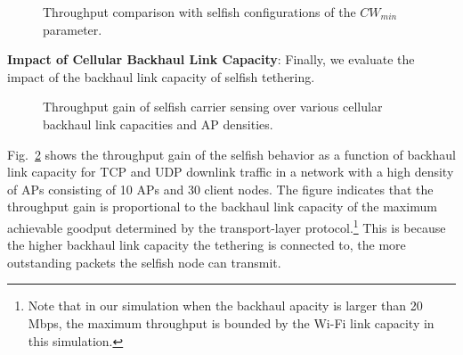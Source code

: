 \begin{figure} [ht]
{      }
    \caption{Throughput comparison with selfish configurations of the $CW_{min}$ parameter.}
    \label{fig:cwmin_cheat}
\end{figure}


%
\textbf{Impact of Cellular Backhaul Link Capacity}:
%
Finally, we evaluate the impact of the backhaul link capacity of
selfish tethering.
%
\begin{figure} [ht]
    \caption{Throughput gain of selfish carrier sensing over
various cellular backhaul link capacities and AP densities.}
    \label{fig:throughput-gain}
\end{figure}
%
Fig.~\ref{fig:throughput-gain} shows the throughput gain of the selfish
behavior as a function of backhaul link capacity for TCP and UDP
downlink traffic in a network with a high density of APs consisting
of 10 APs and 30 client nodes.
The figure indicates that the throughput gain is proportional to the
backhaul link capacity of the maximum achievable goodput determined
by the transport-layer protocol.\footnote{Note that in our simulation
when the backhaul apacity is larger than 20\,Mbps, the maximum
throughput is bounded by the Wi-Fi link capacity in this simulation.}
This is because the higher backhaul link capacity the tethering is
connected to, the more outstanding packets the selfish node can transmit.

